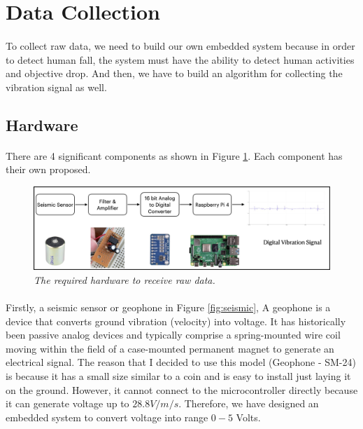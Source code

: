 \section{Data Collection}
\paragraph{}
To collect raw data, we need to build our own embedded system because in order to detect human fall, the system must have the ability to detect human activities and objective drop. And then, we have to build an algorithm for collecting the vibration signal as well.

\subsection{Hardware}
\paragraph{}
	There are 4 significant components as shown in Figure \ref{fig:hardware}. Each component has their own proposed.
    
 \begin{figure}[h]
  \centering
  \caption[The required hardware to receive raw data.]{\emph{The required hardware to receive raw data. \\}}\label{fig:hardware}
  \includegraphics[scale = 0.2]{figures/hardware.jpg}  
\end{figure}

\paragraph{}
Firstly, a seismic sensor or geophone in Figure \ref{fig:seismic}, A geophone is a device that converts ground vibration (velocity) into voltage. It has historically been passive analog devices and typically comprise a spring-mounted wire coil moving within the field of a case-mounted permanent magnet to generate an electrical signal. The reason that I decided to use this model (Geophone - SM-24) is because it has a small size similar to a coin and is easy to install just laying it on the ground. However, it cannot connect to the microcontroller directly because it can generate voltage up to $ 28.8 V / m/s$. Therefore, we have designed an embedded system to convert voltage into range $0 - 5$ Volts.

